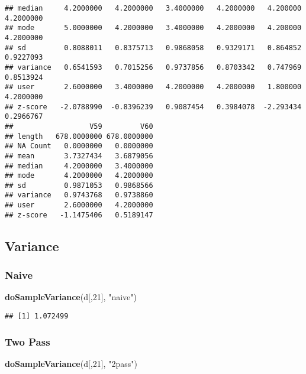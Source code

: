 \documentclass{article}
\newenvironment{Shaded}{\begin{snugshade}}{\end{snugshade}}
\newcommand{\DecValTok}[1]{\textcolor[rgb]{0.00,0.00,0.81}{#1}}
\newcommand{\KeywordTok}[1]{\textcolor[rgb]{0.13,0.29,0.53}{\textbf{#1}}}
\newcommand{\NormalTok}[1]{#1}
\newcommand{\StringTok}[1]{\textcolor[rgb]{0.31,0.60,0.02}{#1}}
\begin{document}
\begin{verbatim}
## median     4.2000000   4.2000000   3.4000000   4.2000000   4.200000   4.2000000
## mode       5.0000000   4.2000000   3.4000000   4.2000000   4.200000   4.2000000
## sd         0.8088011   0.8375713   0.9868058   0.9329171   0.864852   0.9227093
## variance   0.6541593   0.7015256   0.9737856   0.8703342   0.747969   0.8513924
## user       2.6000000   3.4000000   4.2000000   4.2000000   1.800000   4.2000000
## z-score   -2.0788990  -0.8396239   0.9087454   0.3984078  -2.293434   0.2966767
##                  V59         V60
## length   678.0000000 678.0000000
## NA Count   0.0000000   0.0000000
## mean       3.7327434   3.6879056
## median     4.2000000   3.4000000
## mode       4.2000000   4.2000000
## sd         0.9871053   0.9868566
## variance   0.9743768   0.9738860
## user       2.6000000   4.2000000
## z-score   -1.1475406   0.5189147
\end{verbatim}

\hypertarget{variance}{%
\subsection{Variance}\label{variance}}

\hypertarget{naive}{%
\subsubsection{Naive}\label{naive}}

\begin{Shaded}
\begin{Highlighting}[]
\KeywordTok{doSampleVariance}\NormalTok{(d[,}\DecValTok{21}\NormalTok{], }\StringTok{"naive"}\NormalTok{)}
\end{Highlighting}
\end{Shaded}

\begin{verbatim}
## [1] 1.072499
\end{verbatim}

\hypertarget{two-pass}{%
\subsubsection{Two Pass}\label{two-pass}}

\begin{Shaded}
\begin{Highlighting}[]
\KeywordTok{doSampleVariance}\NormalTok{(d[,}\DecValTok{21}\NormalTok{], }\StringTok{"2pass"}\NormalTok{)}
\end{Highlighting}
\end{Shaded}
\end{document}
